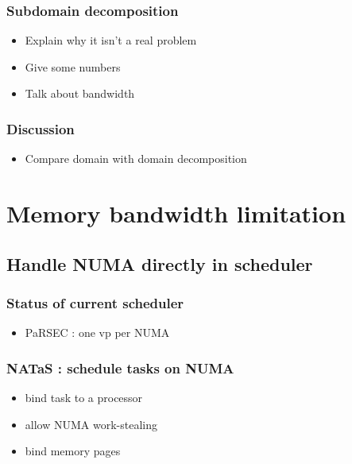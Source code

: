 \documentclass[oneside,12t]{classes/Thesis}
\begin{document}
\subsection{Subdomain decomposition}
  \begin{itemize}
    \item Explain why it isn't a real problem
    \item Give some numbers
    \item Talk about bandwidth
  \end{itemize}
\subsection{Discussion}
  \begin{itemize}
    \item Compare domain with domain decomposition
  \end{itemize}





\chapter{Memory bandwidth limitation}
\minitoc
\vspace{1cm}



\section{Handle NUMA directly in scheduler}
\subsection{Status of current scheduler}
  \begin{itemize}
    \item PaRSEC : one vp per NUMA
  \end{itemize}
\subsection{NATaS : schedule tasks on NUMA}
  \begin{itemize}
    \item bind task to a processor
    \item allow NUMA work-stealing
    \item bind memory pages
  \end{itemize}
\end{document}
